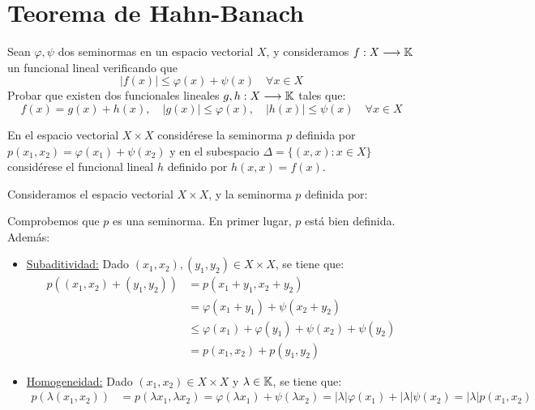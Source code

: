 \section{Teorema de Hahn-Banach}

\begin{ejercicio}
    Sean $\varphi, \psi$ dos seminormas en un espacio vectorial $X$, y consideramos $f: X \longrightarrow \mathbb{K}$ un funcional lineal verificando que
    \[
        |f(x)| \leq \varphi(x) + \psi(x) \quad \forall x \in X
    \]
    Probar que existen dos funcionales lineales $g, h: X \longrightarrow \mathbb{K}$ tales que:
    \[
        f(x) = g(x) + h(x), \quad |g(x)| \leq \varphi(x), \quad |h(x)| \leq \psi(x) \quad \forall x \in X
    \]
    \begin{observacion}
        En el espacio vectorial $X \times X$ considérese la seminorma $p$ definida por $p(x_1, x_2) = \varphi(x_1) + \psi(x_2)$ y en el subespacio $\Delta = \{(x, x) : x \in X\}$ considérese el funcional lineal $h$ definido por $h(x, x) = f(x)$.
    \end{observacion}

    Consideramos el espacio vectorial $X \times X$, y la seminorma $p$ definida por:

    Comprobemos que $p$ es una seminorma. En primer lugar, $p$ está bien definida. Además:
    \begin{itemize}
        \item \ul{Subaditividad:} Dado $(x_1, x_2), (y_1, y_2) \in X \times X$, se tiene que:
        \begin{align*}
            p((x_1, x_2) + (y_1, y_2)) &= p(x_1 + y_1, x_2 + y_2) \\
            &= \varphi(x_1 + y_1) + \psi(x_2 + y_2) \\
            &\leq \varphi(x_1) + \varphi(y_1) + \psi(x_2) + \psi(y_2) \\
            &= p(x_1, x_2) + p(y_1, y_2)
        \end{align*}
        \item \ul{Homogeneidad:} Dado $(x_1, x_2) \in X \times X$ y $\lambda \in \mathbb{K}$, se tiene que:
        \begin{align*}
            p(\lambda(x_1, x_2)) &= p(\lambda x_1, \lambda x_2)
            = \varphi(\lambda x_1) + \psi(\lambda x_2)
            = |\lambda| \varphi(x_1) + |\lambda| \psi(x_2)
            = |\lambda| p(x_1, x_2)
        \end{align*}
    \end{itemize}


\end{ejercicio}
